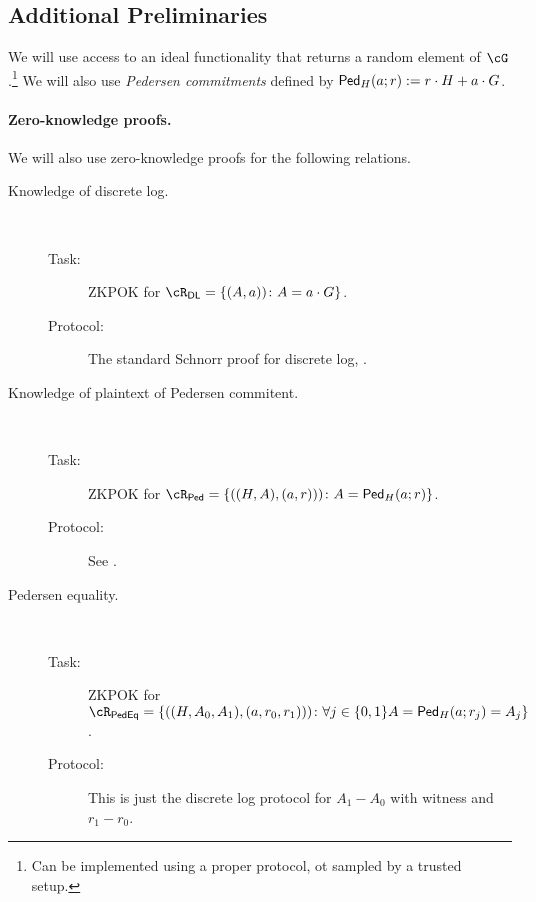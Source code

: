 \subsection{Additional Preliminaries}\label{sec:ChanksEg:Pre}
We will use access to an  ideal functionality \randomH that  returns a random element of $\cG$.\footnote{Can be implemented using a proper protocol, ot sampled by a trusted  setup.} We will also use \textit{Pedersen commitments} defined by $\mathsf{Ped}_H(a;r) := r\cdot H + a \cdot G$. 


\paragraph{Zero-knowledge proofs.}
We will also use zero-knowledge proofs  for the following relations.

\begin{description}
	\item[Knowledge of discrete log.] ~
	
	\begin{description}
		\item[Task:] ZKPOK for $\rdl = \rdlDef$.
		
		\item[Protocol:] The standard Schnorr proof for discrete log, \eg  \cite{Shoup00b}.
	\end{description}
	
	\item[Knowledge of plaintext of Pedersen commitent.] ~
	
		\begin{description}
		\item[Task:] ZKPOK for $\rPed = \rPedDef$.
	
	\item[Protocol:]  See \cite[Protocol A.1]{HaitnerLNR23}.
	\end{description}
	
		\item[Pedersen equality.] ~
	
	\begin{description}
		\item[Task:] ZKPOK for $\rPedEq = \rPedEqDef$.
		
		\item[Protocol:]  This is just the discrete log protocol for $A_1-A_0$ with witness and $r_1 - r_0$.
	\end{description}
	
\end{description}

